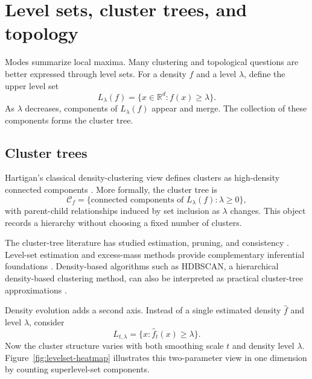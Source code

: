 \documentclass[preprint]{imsart}
\theoremstyle{plain}
\theoremstyle{definition}
\newcommand{\R}{\mathbb{R}}
\newcommand{\fhat}{\widehat f}
\begin{document}
\section{Level sets, cluster trees, and topology}
\label{sec:levelsets}

Modes summarize local maxima. Many clustering and topological questions are better expressed through level sets. For a density $f$ and a level $\lambda$, define the upper level set
\begin{equation*}
  L_\lambda(f)=\{x\in\R^d:f(x)\ge\lambda\}.
\end{equation*}
As $\lambda$ decreases, components of $L_\lambda(f)$ appear and merge. The collection of these components forms the cluster tree.

\subsection{Cluster trees}
\label{subsec:cluster-trees}

Hartigan's classical density-clustering view defines clusters as high-density connected components \citep{hartigan_1975_ClusteringAlgorithms}. More formally, the cluster tree is
\begin{equation*}
  \mathcal C_f = \{\text{connected components of }L_\lambda(f):\lambda\ge0\},
\end{equation*}
with parent-child relationships induced by set inclusion as $\lambda$ changes. This object records a hierarchy without choosing a fixed number of clusters.

The cluster-tree literature has studied estimation, pruning, and consistency 
\citep{stuetzle_2003_EstimatingClusterTree, stuetzle_2010_GeneralizedSingleLinkage, chaudhuri_2010_RatesConvergenceCluster, chaudhuri_2014_ConsistentProceduresCluster, eldridge_2015_HartiganConsistencyMerge}. Level-set estimation and excess-mass methods provide complementary inferential foundations 
\citep{polonik_1995_MeasuringMassConcentrations, tsybakov_1997_NonparametricEstimationDensity, rigollet_2009_OptimalRatesPlugin, samworth_2010_AsymptoticsOptimalBandwidth, rinaldo_2010_GeneralizedDensityClustering, steinwart_2015_FullyAdaptiveDensitybased}.  Density-based algorithms such as HDBSCAN, a hierarchical density-based clustering method, can also be interpreted as practical cluster-tree approximations  \citep{campello_2015_HierarchicalDensityEstimates}.

Density evolution adds a second axis. Instead of a single estimated density $\fhat$ and level $\lambda$, consider
\begin{equation}
  L_{t,\lambda}=\{x:\fhat_t(x)\ge\lambda\}.
  \label{eq:two-parameter-level-set}
\end{equation}
Now the cluster structure varies with both smoothing scale $t$ and density level $\lambda$. Figure~\ref{fig:levelset-heatmap} illustrates this two-parameter view in one dimension by counting superlevel-set components.
\end{document}

